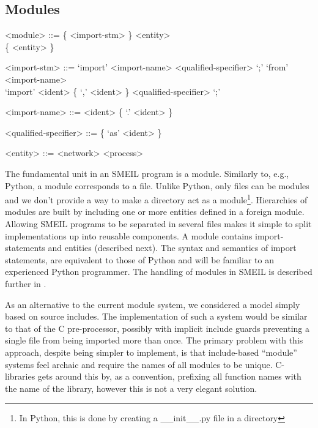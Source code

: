 \setlength{\grammarindent}{10em} %

\subsection{Modules}
\begin{grammar}
  <module> ::= \{ <import-stm> \} <entity> \\ \{ <entity> \}

  <import-stm> ::= `import' <import-name> <qualified-specifier> `;'
  \alt `from' <import-name> \\ `import' <ident> \{ `,' <ident> \} <qualified-specifier>
  `;'

  <import-name> ::= <ident> \{ `.' <ident> \}

  <qualified-specifier> ::= \{ `as' <ident> \}

  <entity> ::= <network>
  \alt <process>
\end{grammar}


The fundamental unit in an SMEIL program is a {\ttfamily module}. Similarly to,
e.g., Python, a module corresponds to a file. Unlike Python, only files can be
modules and we don't provide a way to make a directory act as a
module\footnote{In Python, this is done by creating a {\ttfamily
    \_\_init\_\_.py} file in a directory}. Hierarchies of modules are built by
including one or more entities defined in a foreign module. Allowing SMEIL
programs to be separated in several files makes it simple to split
implementations up into reusable components. A module contains import-statements
and entities (described next). The syntax and semantics of import statements,
are equivalent to those of Python and will be familiar to an experienced Python
programmer. The handling of modules in SMEIL is described further in
.

As an alternative to the current module system, we considered a model simply
based on source includes. The implementation of such a system would be similar
to that of the C pre-processor, possibly with implicit include guards preventing
a single file from being imported more than once. The primary problem with this
approach, despite being simpler to implement, is that include-based ``module''
systems feel archaic and require the names of all modules to be
unique. C-libraries gets around this by, as a convention, prefixing all function
names with the name of the library, however this is not a very elegant solution.

